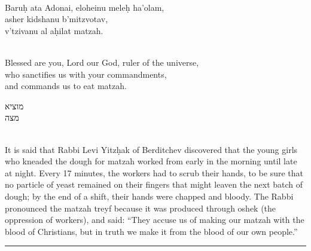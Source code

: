 \documentclass[a4paper,12pt,openany]{memoir}
\newcommand{\hchapter}[1]{
  \begin{hebrew}
    \begin{Spacing}{.97}
      \newpage
      \strut

      \vspace{.15em}

      \noindent\Huge #1

      \vspace{1em}
    \end{Spacing}
  \end{hebrew}
}
\newcommand{\HgFill}{\vfill \hrule \vfill}
\newenvironment{HgEnglish}{\strut\\\noindent}{\vspace{1em}}
\newenvironment{HgTranslit}{\strut\\\noindent\begin{itshape}}{\end{itshape}\vspace{1em}}
\newcommand{\SSrc}{\textsuperscript{\upshape{[S]}}}
\begin{document}
\begin{HgTranslit}
  Baru\d{h} ata Adonai, eloheinu mele\d{h} ha'olam, \\
  asher kidshanu b'mitzvotav, \\
  v'tzivanu al a\d{h}ilat matzah.
\end{HgTranslit}

\begin{HgEnglish}
  Blessed are you, Lord our God, ruler of the universe, \\
  who sanctifies us with your commandments, \\
  and commands us to eat matzah.
\end{HgEnglish}

\vfill

\hchapter{מוציא\\ מצה }

\begin{HgEnglish}
  It is said that Rabbi Levi Yitz\d{h}ak of Berditchev discovered that the young
  girls who kneaded the dough for matzah worked from early in the morning until
  late at night. Every 17 minutes, the workers had to scrub their hands, to be
  sure that no particle of yeast remained on their fingers that might leaven the
  next batch of dough; by the end of a shift, their hands were chapped and
  bloody.  The Rabbi pronounced the matzah treyf because it was produced through
  oshek (the oppression of workers), and said: ``They accuse us of making our
  matzah with the blood of Christians, but in truth we make it from the blood of
  our own people.'' \SSrc
\end{HgEnglish}

\HgFill
\end{document}
